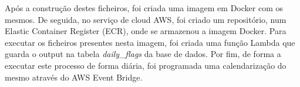 Após a construção destes ficheiros, foi criada uma imagem em Docker com os mesmos. De seguida, no serviço de cloud AWS, foi criado um repositório, num Elastic Container Register (ECR), onde se armazenou a imagem Docker. Para executar os ficheiros presentes nesta imagem, foi criada uma função Lambda que guarda o output na tabela \textit{daily\_flags} da base de dados. Por fim, de forma a executar este processo de forma diária, foi programada uma calendarização do mesmo através do AWS Event Bridge. 

























